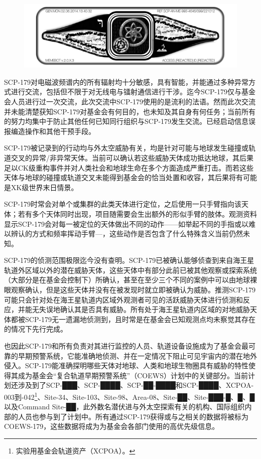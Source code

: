 

\begin{figure}[H]
    \centering
    \includegraphics[width=0.8\linewidth]{images/SCP-179-2.png}
\end{figure}

SCP-179对电磁波频谱内的所有辐射均十分敏感，具有智能，并能通过多种异常方式进行交流，包括但不限于对无线电与镭射通信进行干涉。迄今SCP-179仅与基金会人员进行过一次交流，此次交流中SCP-179使用的是流利的法语。然而此次交流并未能清楚获知SCP-179对基金会有何目的，也未知及其自身有何任务；当前所有的努力均集中于防止其他任何已知同行组织与SCP-179发生交流。已经启动信息误报编造操作和其他干预手段。

SCP-179被记录到的行动均与外太空威胁有关，均是针对可能与地球发生碰撞或轨道交叉的异常\slash 非异常天体。当前可以确认若这些威胁天体成功抵达地球，其后果足以CK级重构事件并对人类社会和地球生命在多个方面造成严重打击。而若这些天体与地球的碰撞或轨道交叉未能得到基金会的恰当处置和收容，其后果将有可能是XK级世界末日情景。

SCP-179时常会对单个或集群的此类天体进行定位，之后使用一只手臂指向该天体；若有多个天体同时出现，项目随需要会生出额外的形似手臂的肢体。观测资料显示SCP-179会对每一被定位的天体做出不同的动作——如举起不同的手指或以难以辨认的方式和频率挥动手臂—，这些动作是否包含了什么特殊含义当前仍然未知。

SCP-179的侦测范围极限迄今没有查明。SCP-179已被确认能够侦查到来自海王星轨道外区域以外的潜在威胁天体，这些天体中有部分此前已被其他观察或探索系统（大部分是在基金会控制下）所确认，甚至在至少三个不同的案例中可以由地球裸眼观察确认，但是这些天体并没有在被发现时就立即被确认为威胁。推测SCP-179可能只会针对处在海王星轨道内区域外观测者可见的活跃威胁天体进行侦测和反应，并能无失误地确认其是否具有威胁。所有处于海王星轨道内区域的对地威胁天体都被SCP-179无一遗漏地侦测到，且时常是在基金会已知观测点均未察觉其存在的情况下先行完成。

也因此SCP-179和所有负责对其进行监控的人员、轨道设备设施成为了基金会最可靠的早期预警系统，它能准确地侦测、并在一定情况下阻止可见宇宙内的潜在地外侵入。SCP-179能准确探明哪些天体对地球、人类和地球生物圈具有威胁的特性使得其成为基金会“复合轨道早期预警系统”（COEWS）计划中的关键部分。当前计划还涉及到了SCP-███、SCP-████、SCP-██-████和SCP-████、XCPOA-003到-042\footnote{实验用基金会轨道资产（XCPOA）。}、Site-34、Site-103、Site-98、Area-08、Site-██、Site-███-█、█、█以及Command Site-██，此外数名潜伏进与外太空探索有关的机构、国际组织内部的人员也参与到了计划中。所有通过SCP-179获得或与之相关的数据将被标为COEWS-179，这些数据将成为为基金会各部门使用的高优先级信息。

